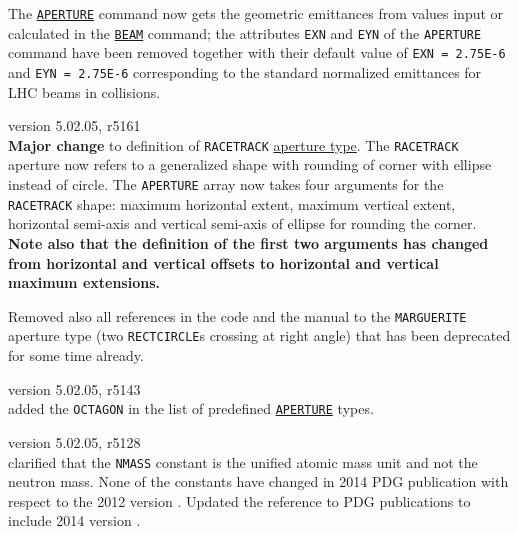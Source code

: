 \begin{madlist}
  The \hyperref[sec:aperture]{\texttt{APERTURE}} command now gets the 
  geometric emittances from values input or calculated in the 
  \hyperref[chap:beam]{\texttt{BEAM}} command; the attributes
  \texttt{EXN} and \texttt{EYN} of the \texttt{APERTURE} command have
  been removed together with their default value of \texttt{EXN =
    2.75E-6} and \texttt{EYN = 2.75E-6} corresponding to the standard
  normalized emittances for LHC beams in collisions. 
  

   version 5.02.05, r5161\\
  \textbf{Major change} to definition of \texttt{RACETRACK} 
  \hyperref[sec:def-aper]{aperture type}. 
  The \texttt{RACETRACK} aperture now refers to a generalized shape 
  with rounding of corner with ellipse instead of circle. 
  The \texttt{APERTURE} array now takes four arguments for the 
  \texttt{RACETRACK} shape: maximum horizontal extent, maximum 
  vertical extent, horizontal semi-axis and vertical semi-axis 
  of ellipse for rounding the corner. \\
  \textbf{Note also that the definition of the first two arguments 
  has changed from horizontal and vertical offsets to horizontal 
  and vertical maximum extensions.}

  Removed also all references in the code and the manual to the 
  \texttt{MARGUERITE} aperture type (two \texttt{RECTCIRCLE}s 
  crossing at right angle) that has been deprecated for some 
  time already.


   version 5.02.05, r5143\\
  added the \texttt{OCTAGON} in the list of predefined 
  \hyperref[chap:aperture]{\texttt{APERTURE}} types.
  
   version 5.02.05, r5128\\
  clarified that the \texttt{NMASS} constant is the unified atomic mass 
  unit and not the neutron mass. None of the constants have changed in 2014 PDG 
  publication with respect to the 2012 version \cite{PDG2012}. Updated
  the reference to PDG publications to include 2014 version \cite{PDG2014}.


\end{madlist}
